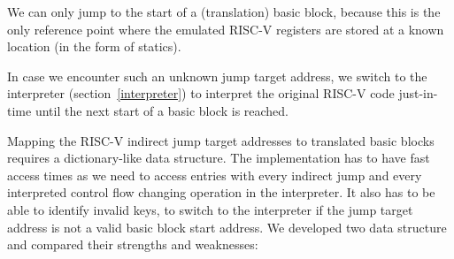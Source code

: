 \documentclass[course=eragp]{aspdoc}
\begin{document}
We can only jump to the start of a (translation) basic block, because this is the only reference point where the
emulated RISC-V registers are stored at a known location (in the form of statics).

In case we encounter such an unknown jump target address, we switch to the interpreter (section~\ref{interpreter}) to
interpret the original RISC-V code just-in-time until the next start of a basic block is reached.

\par

Mapping the RISC-V indirect jump target addresses to translated basic blocks requires a
dictionary-like data structure.
The implementation has to have fast access times as we need to access entries with
every indirect jump and every interpreted control flow changing operation in the interpreter. It also has to be able
to identify invalid keys, to switch to the interpreter if the
jump target address is not a valid basic block start address. We developed two data structure and
compared their strengths and weaknesses:
\end{document}

